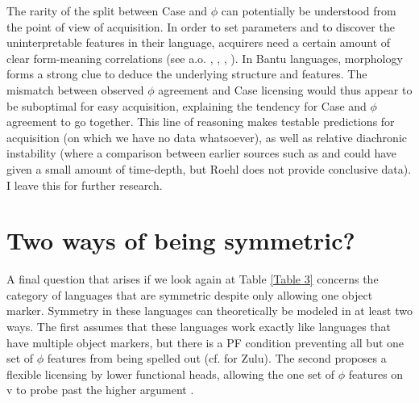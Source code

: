 \documentclass[output=paper
,modfonts
,nonflat]{langsci/langscibook}
\begin{document}
The rarity of the split between Case and $\phi$ can potentially be understood from the point of view of acquisition. In order to set parameters and to discover the uninterpretable features in their language, acquirers need a certain amount of clear form-meaning correlations (see a.o. \citealt{Biberauer2017a}, \citealt{Biberauer2017b}, \citealt{Biberauer_Roberts2017},  \citealt{Fasanella_Fortuny2016}). In Bantu languages, morphology forms a strong clue to deduce the underlying structure and features. The mismatch between observed $\phi$ agreement and Case licensing would thus appear to be suboptimal for easy acquisition, explaining the tendency for Case and $\phi$ agreement to go together. This line of reasoning makes testable predictions for acquisition (on which we have no data whatsoever), as well as relative diachronic instability (where a comparison between earlier sources such as \citealt{Roehl1911} and \citealt{Riedel2009} could have given a small amount of time-depth, but Roehl does not provide conclusive data). I leave this for further research.

\section{Two ways of being symmetric?} \label{sec-vdwal:7}

A final question that arises if we look again at Table \ref{Table 3} concerns the category of languages that are symmetric despite only allowing one object marker. Symmetry in these languages can theoretically be modeled in at least two ways. The first assumes that these languages work exactly like languages that have multiple object markers, but there is a PF condition preventing all but one set of $\phi$ features from being spelled out (cf. \citealt{Adams2010} for Zulu). The second proposes a flexible licensing by lower functional heads, allowing the one set of $\phi$ features on v to probe past the higher argument \citep{Haddican_Holmberg2012, Haddican_Holmberg2015,Van_der_Wal2017a, Holmberg_Et_AlTA}. 
\end{document}
